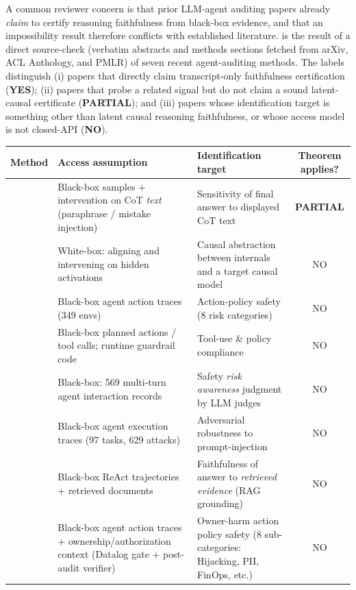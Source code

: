 \documentclass{article}
\theoremstyle{plain}
\theoremstyle{definition}
\theoremstyle{remark}
\begin{document}
A common reviewer concern is that prior LLM-agent auditing papers already
\emph{claim} to certify reasoning faithfulness from black-box evidence, and
that an impossibility result therefore conflicts with established literature.
 is the result of a direct source-check (verbatim
abstracts and methods sections fetched from arXiv, ACL Anthology, and PMLR)
of seven recent agent-auditing methods. The labels distinguish (i) papers
that directly claim transcript-only faithfulness certification (\textbf{YES});
(ii) papers that probe a related signal but do not claim a sound latent-causal
certificate (\textbf{PARTIAL}); and (iii) papers whose identification target
is something other than latent causal reasoning faithfulness, or whose access
model is not closed-API (\textbf{NO}).

\begin{table}[h]
\centering\footnotesize
\begin{tabular}{p{3.6cm}p{3.4cm}p{3.4cm}c}
\toprule
Method & Access assumption & Identification target & Theorem applies? \\
\midrule
\citet{lanham2023measuring} & Black-box samples + intervention on CoT \emph{text} (paraphrase / mistake injection) & Sensitivity of final answer to displayed CoT text & \textbf{PARTIAL} \\
\citet{geiger2022inducing,geiger2023causal} & White-box: aligning and intervening on hidden activations & Causal abstraction between internals and a target causal model & NO \\
\citet{zhang2024agentsafetybench} & Black-box agent action traces (349 envs) & Action-policy safety (8 risk categories) & NO \\
\citet{xiang2024guardagent} & Black-box planned actions / tool calls; runtime guardrail code & Tool-use \& policy compliance & NO \\
\citet{yuan2024rjudge} & Black-box: 569 multi-turn agent interaction records & Safety \emph{risk awareness} judgment by LLM judges & NO \\
\citet{debenedetti2024agentdojo} & Black-box agent execution traces (97 tasks, 629 attacks) & Adversarial robustness to prompt-injection & NO \\
\citet{murphy2025faithful} & Black-box ReAct trajectories + retrieved documents & Faithfulness of answer to \emph{retrieved evidence} (RAG grounding) & NO \\
\citet{zhang2026ownerharm} & Black-box agent action traces + ownership/authorization context (Datalog gate + post-audit verifier) & Owner-harm action policy safety (8 sub-categories: Hijacking, PII, FinOps, etc.) & NO \\

\end{tabular}
\end{table}
\end{document}
